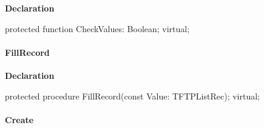 \documentclass{report}
\newif\ifpdf
\begin{document}
\label{ftpsend.TFTPList-CheckValues}
\begin{list}{}{
\setlength{\itemindent}{0cm}
\setlength{\listparindent}{0cm}
\setlength{\leftmargin}{\evensidemargin}
\addtolength{\leftmargin}{\tmplength}
\settowidth{\labelsep}{X}
\addtolength{\leftmargin}{\labelsep}
\setlength{\labelwidth}{\tmplength}
}
\item[\textbf{Declaration}\hfill]
\ifpdf
\begin{flushleft}
\fi
\begin{ttfamily}
protected function CheckValues: Boolean; virtual;\end{ttfamily}

\ifpdf
\end{flushleft}
\fi

\end{list}
\paragraph*{FillRecord}\hspace*{\fill}

\label{ftpsend.TFTPList-FillRecord}
\begin{list}{}{
\setlength{\itemindent}{0cm}
\setlength{\listparindent}{0cm}
\setlength{\leftmargin}{\evensidemargin}
\addtolength{\leftmargin}{\tmplength}
\settowidth{\labelsep}{X}
\addtolength{\leftmargin}{\labelsep}
\setlength{\labelwidth}{\tmplength}
}
\item[\textbf{Declaration}\hfill]
\ifpdf
\begin{flushleft}
\fi
\begin{ttfamily}
protected procedure FillRecord(const Value: TFTPListRec); virtual;\end{ttfamily}

\ifpdf
\end{flushleft}
\fi

\end{list}
\paragraph*{Create}\hspace*{\fill}
\end{document}
